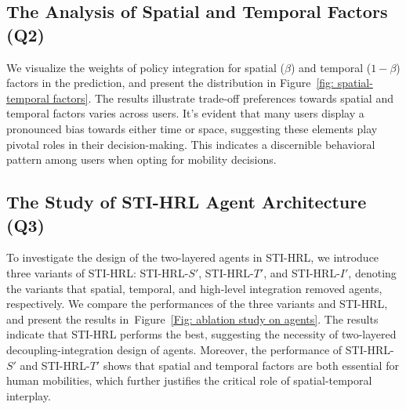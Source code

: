 \documentclass[letterpaper]{article} %
\begin{document}
\subsection{The Analysis of Spatial and Temporal Factors (Q2)}
We visualize the weights of policy integration for spatial ($\beta$) and temporal ($1-\beta$) factors in the prediction, and present the distribution in
Figure~\ref{fig: spatial-temporal factors}.
The results illustrate trade-off preferences towards spatial and temporal factors varies across users.
It's evident that many users display a pronounced bias towards either time or space, suggesting these elements play pivotal roles in their decision-making. This indicates a discernible behavioral pattern among users when opting for mobility decisions.

\subsection{The Study of STI-HRL Agent Architecture (Q3)}
To investigate the design of the two-layered agents in STI-HRL, we introduce three variants of STI-HRL:  STI-HRL-$S'$, STI-HRL-$T'$, and STI-HRL-$I'$, denoting the variants that spatial, temporal, and high-level integration removed agents, respectively.
We compare the performances of the three variants and STI-HRL,  and present the results in~Figure~\ref{Fig: ablation study on agents}.
The results indicate that STI-HRL performs the best, suggesting the necessity of two-layered decoupling-integration design of agents.
Moreover, the performance of STI-HRL-$S'$ and STI-HRL-$T'$ shows that spatial and temporal factors are both essential for human mobilities, which further justifies the critical role of spatial-temporal interplay.
\end{document}
